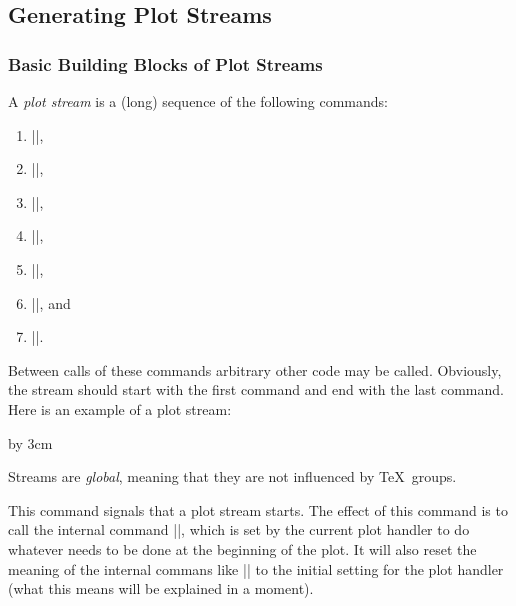 \subsection{Generating Plot Streams}

\subsubsection{Basic Building Blocks of Plot Streams}

A \emph{plot stream} is a (long) sequence of the following 
commands:
\begin{enumerate}
\item
  |\pgfplotstreamstart|,
\item
  |\pgfplotstreampoint|, 
\item
  |\pgfplotstreampointoutlier|, 
\item
  |\pgfplotstreampointundefined|,
\item
  |\pgfplotstreamnewdataset|,
\item
  |\pgfplotstreamspecial|, and
\item
  |\pgfplotstreamend|.
\end{enumerate}
Between calls of these commands arbitrary other code may be
called. Obviously, the stream should start with the first command and
end with the last command. Here is an example of a plot stream:
\begin{codeexample}
\pgfplotstreamstart
\pgfplotstreampoint{\pgfpoint{1cm}{1cm}}
\newdimen\mydim
\mydim=2cm
\pgfplotstreampoint{\pgfpoint{\mydim}{2cm}}
\advance \mydim by 3cm
\pgfplotstreampoint{\pgfpoint{\mydim}{2cm}}
\pgfplotstreamend
\end{codeexample}

Streams are \emph{global}, meaning that they are not influenced by
\TeX\ groups.

\begin{command}{\pgfplotstreamstart}
  This command signals that a plot stream starts. The effect of this
  command is to call the internal command |\pgf@plotstreamstart|,
  which is set by the current plot handler to do whatever needs to be
  done at the beginning of the plot. It will also reset the
  meaning of the internal commans like |\pgf@plotstreampoint| to the
  initial setting for the plot handler (what this means will be
  explained in a moment).
\end{command}

